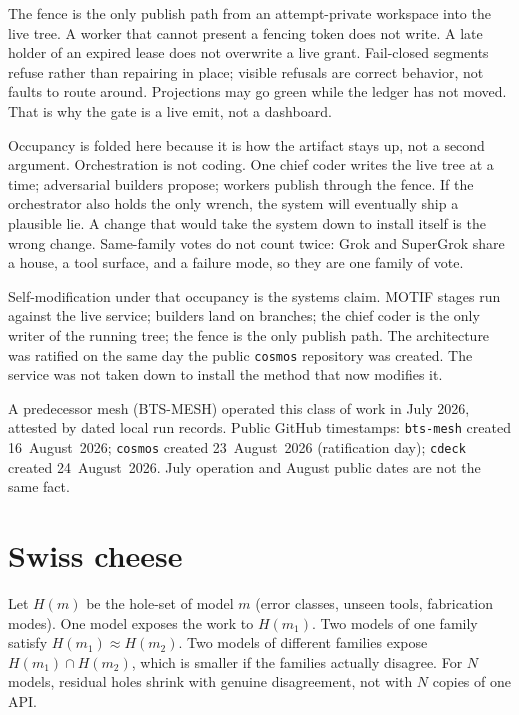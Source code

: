 \documentclass[11pt]{article}
\begin{document}
The fence is the only publish path from an attempt-private workspace
into the live tree. A worker that cannot present a fencing token does
not write. A late holder of an expired lease does not overwrite a live
grant. Fail-closed segments refuse rather than repairing in place;
visible refusals are correct behavior, not faults to route around.
Projections may go green while the ledger has not moved. That is why
the gate is a live emit, not a dashboard.

Occupancy is folded here because it is how the artifact stays up, not a
second argument. Orchestration is not coding. One chief coder writes
the live tree at a time; adversarial builders propose; workers publish
through the fence. If the orchestrator also holds the only wrench, the
system will eventually ship a plausible lie. A change that would take
the system down to install itself is the wrong change. Same-family
votes do not count twice: Grok and SuperGrok share a house, a tool
surface, and a failure mode, so they are one family of vote.

Self-modification under that occupancy is the systems claim. MOTIF
stages run against the live service; builders land on branches; the
chief coder is the only writer of the running tree; the fence is the
only publish path. The architecture was ratified on the same day the
public \texttt{cosmos} repository was created. The service was not
taken down to install the method that now modifies it.

A predecessor mesh (BTS-MESH) operated this class of work in July 2026,
attested by dated local run records. Public GitHub timestamps:
\texttt{bts-mesh} created 16~August~2026;
\texttt{cosmos} created 23~August~2026 (ratification day);
\texttt{cdeck} created 24~August~2026. July operation and August public
dates are not the same fact.

\section{Swiss cheese}

Let $H(m)$ be the hole-set of model $m$ (error classes, unseen tools,
fabrication modes). One model exposes the work to $H(m_1)$. Two models
of one family satisfy $H(m_1)\approx H(m_2)$. Two models of different
families expose $H(m_1)\cap H(m_2)$, which is smaller if the families
actually disagree. For $N$ models, residual holes shrink with genuine
disagreement, not with $N$ copies of one API.
\end{document}
